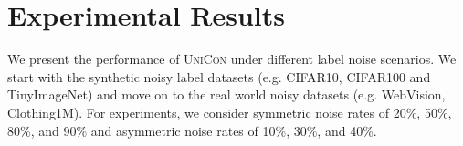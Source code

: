 \documentclass[10pt,twocolumn,letterpaper]{article}
\begin{document}
\begin{table}[t]
\vspace{-2.5mm}
\centering
\medskip{}
\vspace{-1mm}
\caption{Experimental results on CIFAR10 and CIFAR100 with asymmetric noise. \textsc{UniCon} sees consistent improvement for CIFAR100 dataset under different asymmetric noise settings.  indicates that we run the algorithm.}
\label{tab:asymmetry_cifar10_100}
\vspace{-2mm}
\end{table}

\section{Experimental Results}
We present the performance of \textsc{UniCon} under different label noise scenarios. We start with the synthetic noisy label datasets (e.g. CIFAR10, CIFAR100 and TinyImageNet) and move on to the real world noisy datasets (e.g. WebVision, Clothing1M). For experiments, we consider symmetric noise rates of 20\%, 50\%, 80\%, and 90\% and asymmetric noise rates of 10\%, 30\%, and 40\%. 
\end{document}
